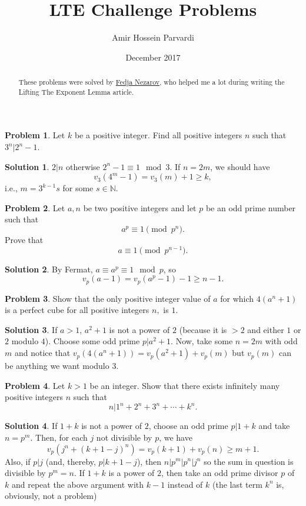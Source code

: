 \documentclass{article}
\title{LTE Challenge Problems}
\author{Amir Hossein Parvardi}
\date{December 2017}
\theoremstyle{definition}
\newtheorem{problem}{Problem}
\newtheorem*{solution}{Solution}
\begin{document}
\maketitle

\begin{abstract}
    These problems were solved by  \href{http://users.math.msu.edu/users/fedja/}{Fedja Nezarov}, who helped me a lot during writing the Lifting The Exponent Lemma article.
\end{abstract}
\begin{problem}
Let $k$ be a positive integer. Find all positive integers $n$ such that $3^n |2^n-1$.

\end{problem}

\begin{solution}
$2|n$ otherwise $2^n-1\equiv 1\mod 3$. If $n=2m$, we should have $$v_3(4^m-1)=v_3(m)+1\ge k,$$ i.e., $m=3^{k-1}s$ for some $s\in\mathbb N$.
\end{solution}

\begin{problem}
Let $a,n$ be two positive integers and let $p$ be an odd prime number such that
$$a^p \equiv 1 \pmod{p^n}.$$ Prove that
$$a \equiv 1 \pmod{p^{n-1}}.$$
\end{problem}

\begin{solution}
By Fermat, $a\equiv a^p\equiv 1\mod p$, so $$v_p(a-1)=v_p(a^p-1)-1\ge n-1.$$
\end{solution}


\begin{problem}
Show that the only positive integer value of $a$ for which $4(a^n+1)$ is a perfect cube for all positive integers $n,$ is $1.$
\end{problem}


\begin{solution}
If $a>1$, $a^2+1$ is not a power of $2$ (because it is $>2$ and either $1$ or $2$ modulo $4$).
Choose some odd prime $p|a^2+1$. Now, take some $n=2m$ with odd $m$ and notice that $v_p(4(a^n+1))=v_p(a^2+1)+v_p(m)$ but $v_p(m)$ can be anything we want modulo $3$.
\end{solution}

\begin{problem}
Let $k>1$ be an integer. Show that there exists infinitely many positive integers $n$ such that
\[n | 1^n + 2^n +3^n +\cdots+k^n.\]
\end{problem}

\begin{solution}
If $1+k$ is not a power of $2$, choose an odd prime $p|1+k$ and take $n=p^m$. Then, for each $j$ not divisible by $p$, we have $$v_p(j^n+(k+1-j)^n)=v_p(k+1)+v_p(n)\ge m+1.$$ Also, if $p|j$ (and, thereby, $p|k+1-j$), then $n|p^m|p^n|j^n$ so the sum in question is divisible by $p^m=n$.
If $1+k$ is a power of $2$, then take an odd prime divisor $p$ of $k$ and repeat the above argument with $k-1$ instead of $k$ (the last term $k^n$ is, obviously, not a problem)
\end{solution}
\end{document}

